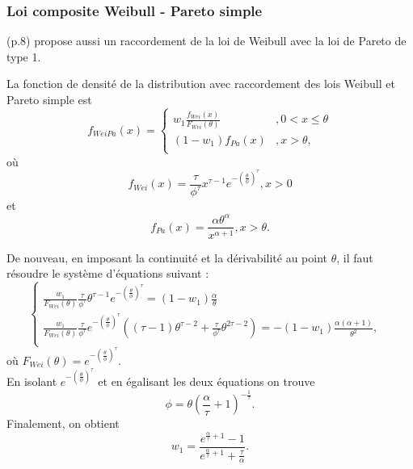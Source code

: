 	\subsubsection{Loi composite Weibull - Pareto simple} 
	\cite{brazauskas2016modeling} (p.8) propose aussi un raccordement de la loi de Weibull avec la loi de Pareto de type 1.
	\begin{Definition}
		La fonction de densité de la distribution avec raccordement des lois Weibull et Pareto simple est
		$$
			f_{WeiPa}(x) = \left\{
			\begin{array}{ll}
				w_1 \frac{f_{Wei}(x)}{F_{Wei}(\theta)} & ,0 < x \leq \theta \\
				(1-w_1) {f_{Pa}(x)}& , x > \theta,  \\
			\end{array}
			\right.
		$$
		où $$f_{Wei}(x)= \frac{\tau}{\phi^{\tau}} x^{\tau -1} e^{- \left(\frac{\theta}{\phi}\right)^{\tau} }, x>0$$ et $$f_{Pa}(x)= \frac{\alpha \theta^{\alpha}}{x^{\alpha+1}}, x>\theta. $$
		\end{Definition} 
	
	De nouveau, en imposant la continuité et la dérivabilité au point $\theta$, il faut résoudre le système d'équations suivant :
	$$
		\left\{
		\begin{array}{ll}
			\frac{w_1}{F_{Wei}(\theta)}	\frac{\tau}{\phi^{\tau}} \theta^{\tau -1} e^{- \left(\frac{\theta}{\phi}\right)^{\tau} }
			= (1-w_1) \frac{\alpha}{\theta} &  \\
			\frac{w_1}{F_{Wei}(\theta)}	\frac{\tau}{\phi^{\tau}}  e^{- \left(\frac{\theta}{\phi}\right)^{\tau} }
			((\tau -1) \theta^{\tau -2}+\frac{\tau}{\phi^{\tau}} \theta^{2\tau -2})
			= -(1-w_1)  \frac{\alpha (\alpha +1)}{\theta^2}, & \\
		\end{array}
		\right.
	$$
	où $F_{Wei}(\theta) = e^{-\left(\frac{\theta}{\phi}\right)^{\tau}}$.\\
	
	En isolant $e^{- \left(\frac{\theta}{\phi}\right)^{\tau} }$ et en égalisant les deux équations on trouve
	$$\phi = \theta \left(\frac{\alpha}{\tau}+1\right)^{- \frac{1}{\tau}}.$$
	Finalement, on obtient
	$$w_1 = \frac{e^{\frac{\alpha}{\tau}+1}-1}{e^{\frac{\alpha}{\tau}+1}+\frac{\tau}{\alpha}}.$$
	
